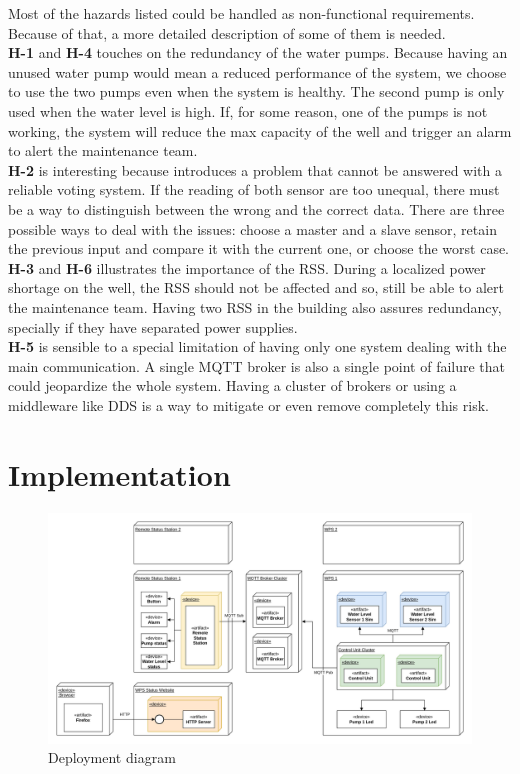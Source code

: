 \documentclass[11pt]{article}
\begin{document}
Most of the hazards listed could be handled as non-functional requirements. Because of that, a more detailed description of some of them is needed.
\\[12pt]
\textbf{H-1} and \textbf{H-4} touches on the redundancy of the water pumps. Because having an unused water pump would mean a reduced performance of the system, we choose to use the two pumps even when the system is healthy. The second pump is only used when the water level is high. If, for some reason, one of the pumps is not working, the system will reduce the max capacity of the well and trigger an alarm to alert the maintenance team.
\\[12pt]
\textbf{H-2} is interesting because introduces a problem that cannot be answered with a reliable voting system. If the reading of both sensor are too unequal, there must be a way to distinguish between the wrong and the correct data. There are three possible ways to deal with the issues: choose a master and a slave sensor, retain the previous input and compare it with the current one, or choose the worst case.
\\[12pt]
\textbf{H-3} and \textbf{H-6} illustrates the importance of the RSS. During a localized power shortage on the well, the RSS should not be affected and so, still be able to alert the maintenance team. Having two RSS in the building also assures redundancy, specially if they have separated power supplies.
\\[12pt]
\textbf{H-5} is sensible to a special limitation of having only one system dealing with the main communication. A single MQTT broker is also a single point of failure that could jeopardize the whole system. Having a cluster of brokers or using a middleware like DDS is a way to mitigate or even remove completely this risk.

\newpage
\section{Implementation}

\begin{figure}[H]
  \centering
  \includegraphics[width=\linewidth]{../diagrams/deployment-diagram-WPS.jpg}
  \caption{Deployment diagram}
  \label{fig:Deployment Diagram}
\end{figure}
\end{document}
